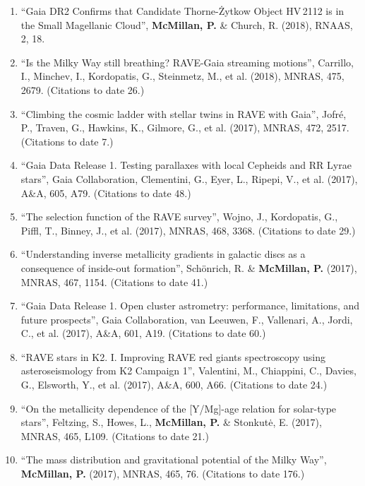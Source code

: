 \documentclass{resume}
\begin{document}
\begin{enumerate}
\item ``Gaia DR2 Confirms that Candidate Thorne-\.Zytkow Object HV\,2112 is in the Small Magellanic Cloud'', \textbf{McMillan, P.} \& Church, R. (2018), RNAAS, 2, 18.

\item ``Is the Milky Way still breathing? RAVE-Gaia streaming motions'', Carrillo, I., Minchev, I., Kordopatis, G., Steinmetz, M., et al. (2018), MNRAS, 475, 2679. (Citations to date 26.)

\item ``Climbing the cosmic ladder with stellar twins in RAVE with Gaia'', Jofr\'e, P., Traven, G., Hawkins, K., Gilmore, G., et al. (2017), MNRAS, 472, 2517. (Citations to date 7.)

\item ``Gaia Data Release 1. Testing parallaxes with local Cepheids and RR Lyrae stars'', Gaia Collaboration, Clementini, G., Eyer, L., Ripepi, V., et al. (2017), A\&A, 605, A79. (Citations to date 48.)

\item ``The selection function of the RAVE survey'', Wojno, J., Kordopatis, G., Piffl, T., Binney, J., et al. (2017), MNRAS, 468, 3368. (Citations to date 29.)

\item ``Understanding inverse metallicity gradients in galactic discs as a consequence of inside-out formation'', Sch\"onrich, R. \& \textbf{McMillan, P.} (2017), MNRAS, 467, 1154. (Citations to date 41.)

\item ``Gaia Data Release 1. Open cluster astrometry: performance, limitations, and future prospects'', Gaia Collaboration, van Leeuwen, F., Vallenari, A., Jordi, C., et al. (2017), A\&A, 601, A19. (Citations to date 60.)

\item ``RAVE stars in K2. I. Improving RAVE red giants spectroscopy using asteroseismology from K2 Campaign 1'', Valentini, M., Chiappini, C., Davies, G., Elsworth, Y., et al. (2017), A\&A, 600, A66. (Citations to date 24.)

\item ``On the metallicity dependence of the [Y/Mg]-age relation for solar-type stars'', Feltzing, S., Howes, L., \textbf{McMillan, P.} \& Stonkut\.{e}, E. (2017), MNRAS, 465, L109. (Citations to date 21.)

\item ``The mass distribution and gravitational potential of the Milky Way'', \textbf{McMillan, P.} (2017), MNRAS, 465, 76. (Citations to date 176.)


\end{enumerate}
\end{document}
